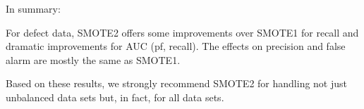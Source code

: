 In summary:

\begin{lesson1}
    For defect data, SMOTE2  
 offers   some  improvements over SMOTE1 for recall
 and dramatic improvements for AUC (pf, recall).
 The effects on precision and false alarm are mostly the same as SMOTE1.
\end{lesson1}

Based on these results, we strongly
recommend SMOTE2 for handling not just unbalanced
data sets but, in fact, for all data sets.

